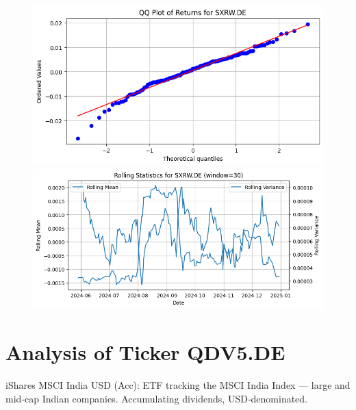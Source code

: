 \documentclass{article}%
\begin{document}
%


\begin{figure}[htbp]%
\begin{minipage}{0.31\textwidth}%
\includegraphics[width=\linewidth]{ticker_images/SXRW.DE_qq_plot.png}%
\end{minipage}%
\begin{minipage}{0.31\textwidth}%
\includegraphics[width=\linewidth]{ticker_images/SXRW.DE_rolling_stats.png}%
\end{minipage}%
\end{figure}

%
\section*{Analysis of Ticker QDV5.DE}%
\label{sec:AnalysisofTickerQDV5.DE}%
iShares MSCI India USD (Acc): ETF tracking the MSCI India Index — large and mid‑cap Indian companies. Accumulating dividends, USD‑denominated.%
\end{document}
